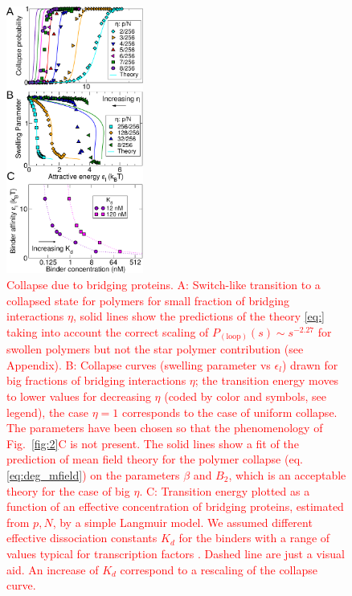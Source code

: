 \documentclass[
preprint,
a4paper,
12pt,
superscriptaddress,
pre]{revtex4}
\newcommand{\rev}[1]{\textcolor{red}{#1}}
\begin{document}
\begin{figure}
  \centering
  \includegraphics[width=0.4\textwidth]{fig3}
  \caption{\rev{Collapse due to bridging proteins.  A: Switch-like
    transition to a collapsed state for polymers for small fraction of
    bridging interactions $\eta$, solid lines show the predictions of
    the theory \ref{eq:} taking into account the correct scaling of
    $P_\mathrm{(loop)}(s) \sim s^{-2.27}$ for swollen polymers but not the star
    polymer contribution (see Appendix).
%
B: Collapse curves (swelling parameter vs
    $\epsilon_l$) drawn for big fractions of bridging
    interactions $\eta$; the transition energy moves to
    lower values for decreasing $\eta$ (coded by color and
    symbols, see legend), the case $\eta=1$ corresponds to the case of
    uniform collapse. The parameters have been chosen so that the
    phenomenology of Fig.~\ref{fig:2}C is not present. The solid lines
    show a fit of the prediction of mean field theory for the polymer
    collapse (eq. \ref{eq:deg_mfield}) on the parameters $\beta$ and
    $B_2$, which is an acceptable theory for the case of big $\eta$.
C:  Transition energy plotted as a function of an effective
concentration  of bridging proteins, estimated  from $p,N$, by a
simple 
Langmuir model. We assumed different effective dissociation constants $K_d$ 
for the binders with a range of values typical for transcription
factors \cite{Buchler29042003}. Dashed line are just a visual aid. An
increase of $K_d$ correspond to a rescaling of the collapse curve.}
%
}
  \label{fig:3}
\end{figure}
\end{document}

